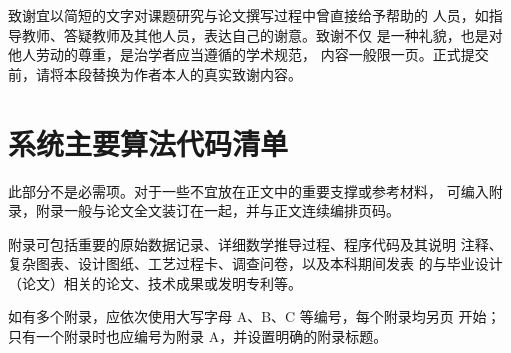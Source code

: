 \documentclass{swutthesis}
\begin{document}
\backmatter

\nocite{*}
\printbibliography[heading=bibliography,title={参考文献}]

\begin{acknowledgements}
致谢宜以简短的文字对课题研究与论文撰写过程中曾直接给予帮助的
人员，如指导教师、答疑教师及其他人员，表达自己的谢意。致谢不仅
是一种礼貌，也是对他人劳动的尊重，是治学者应当遵循的学术规范，
内容一般限一页。正式提交前，请将本段替换为作者本人的真实致谢内容。
\end{acknowledgements}

\appendix
\chapter{系统主要算法代码清单}

此部分不是必需项。对于一些不宜放在正文中的重要支撑或参考材料，
可编入附录，附录一般与论文全文装订在一起，并与正文连续编排页码。

附录可包括重要的原始数据记录、详细数学推导过程、程序代码及其说明
注释、复杂图表、设计图纸、工艺过程卡、调查问卷，以及本科期间发表
的与毕业设计（论文）相关的论文、技术成果或发明专利等。

如有多个附录，应依次使用大写字母 A、B、C 等编号，每个附录均另页
开始；只有一个附录时也应编号为附录 A，并设置明确的附录标题。
\end{document}
